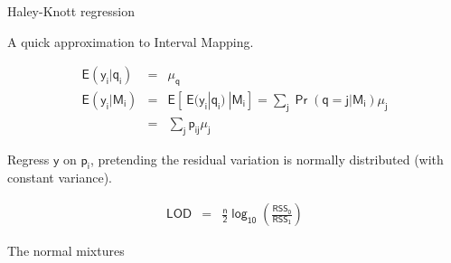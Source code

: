 \documentclass[12pt]{article}
\newcommand{\headsize}{\fontsize{35}{35} \selectfont}
\newcommand{\smallsize}{\fontsize{25}{30} \selectfont}
\newcommand{\smallersize}{\fontsize{20}{25} \selectfont}
\newcommand{\lod}{\text{LOD}}
\newcommand{\rss}{\text{RSS}}
\begin{document}
\newpage

\headsize \color{myyellow}
\hfill \begin{minipage}{5.75in}
\centering
Haley-Knott regression
\end{minipage}

\vspace{3cm}

\color{mywhite} \smallsize

\hspace*{0.5in}
A quick approximation to Interval Mapping.

\smallersize

\begin{eqnarray*}
\mathsf{E(y_i | q_i)} & = & \mathsf{ \mu_q } \\[24pt]
\mathsf{E(y_i | M_i)} & = & \mathsf{E[ \ E(y_i|q_i) \ | M_i]}
 =  \mathsf{\textstyle{\sum_j \Pr(q=j|M_i) \mu_j}} \\[12pt]
& = & \mathsf{\textstyle{\sum_j p_{ij} \mu_j}}
\end{eqnarray*}

\vspace{1cm}

\hfill \begin{minipage}{10in}
\setlength{\rightskip}{0pt plus 1fil} %
{\color{mypink} Regress $\mathsf{y}$ on $\mathsf{p_i}$}, pretending the residual
variation is normally distributed (with constant variance).
\end{minipage}

\begin{eqnarray*}
\mathsf{\lod} & = & \mathsf{\frac{n}{2} \log_{10} \left( \frac{\rss_0}{\rss_1} \right)}
\end{eqnarray*}

\newpage

\headsize \color{myyellow}
\hfill \begin{minipage}{5.75in}
\centering
The normal mixtures
\end{minipage}

\vspace{15mm}
\end{document}
